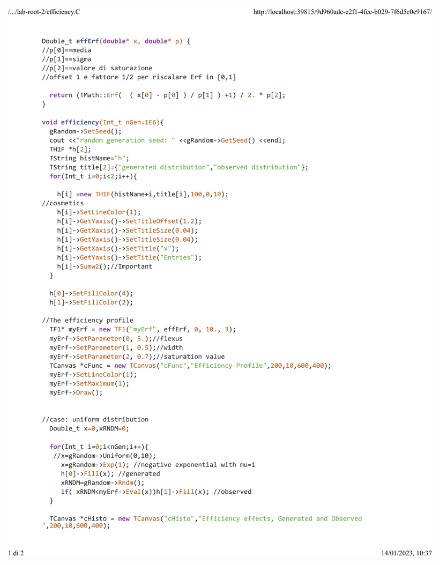 \documentclass[10pt,a4paper]{article}
\begin{document}
\begin{figure}[h!]
	\centering
	\includegraphics[width=1.\linewidth]{_..._lab-root-2_efficiency.C}
	\caption{}
	\label{fig:5}
\end{figure}
\newpage
\end{document}
